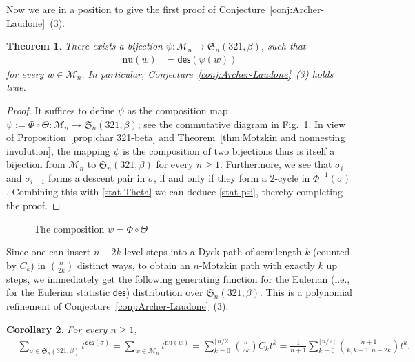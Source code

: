 \documentclass[12pt]{amsart}
\numberwithin{equation}{section}
\theoremstyle{plain}
\newtheorem{theorem}{Theorem}[section]
\newtheorem{corollary}[theorem]{Corollary}
\def\fS{\mathfrak{S}}
\def\cM{\mathcal{M}}
\def\des{\mathsf{des}}
\def\rI{\mathrm{I}}
\def\nou{\mathrm{nu}}
\begin{document}
Now we are in a position to give the first proof of Conjecture~\ref{conj:Archer-Laudone}~(3).
\begin{theorem}\label{thm:beta-Biane}
There exists a bijection $\psi: \cM_n \to \fS_n(321,\beta)$, such that
\begin{align}\label{stat-psi}
	\nou(w) &= \des(\psi(w))
\end{align}
for every $w \in\cM_n$. In particular, Conjecture~\ref{conj:Archer-Laudone}~(3) holds true.
\end{theorem}	

\begin{proof}
It suffices to define $\psi$ as the composition map $\psi:=\Phi\circ\Theta:\cM_n\to \fS_n(321,\beta)$; see the commutative diagram in Fig.~\ref{triangle}. In view of Proposition~\ref{prop:char 321-beta} and Theorem~\ref{thm:Motzkin and nonnesting involution}, the mapping $\psi$ is the composition of two bijections thus is itself a bijection from $\cM_n$ to $\fS_n(321,\beta)$ for every $n\ge 1$. Furthermore, we see that $\sigma_i$ and $\sigma_{i+1}$ forms a descent pair in $\sigma$, if and only if they form a $2$-cycle in $\Phi^{-1}(\sigma)$. Combining this with \eqref{stat-Theta} we can deduce \eqref{stat-psi}, thereby completing the proof.
\end{proof}

\begin{figure}[h!]
\caption{The composition $\psi=\Phi\circ\Theta$ \label{triangle}}
\end{figure}

Since one can insert $n-2k$ level steps into a Dyck path of semilength $k$ (counted by $C_k$) in $\binom{n}{2k}$ distinct ways, to obtain an $n$-Motzkin path with exactly $k$ up steps, we immediately get the following generating function for the Eulerian (i.e., for the Eulerian statistic $\des$) distribution over $\fS_n(321,\beta)$. This is a polynomial refinement of Conjecture~\ref{conj:Archer-Laudone}~(3).
\begin{corollary}
For every $n\ge1$,
\begin{align}
	& \sum_{\sigma\in \fS_n(321,\beta)} t^{\des(\sigma)} = \sum_{w\in\cM_n} t^{\nou(w)} =
	\sum_{k=0}^{\lfloor n/2\rfloor}\binom{n}{2k}C_k t^k=\frac{1}{n+1}\sum_{k=0}^{\lfloor n/2\rfloor}\binom{n+1}{k,k+1,n-2k}t^k.
\end{align}
\end{corollary}
\end{document}
